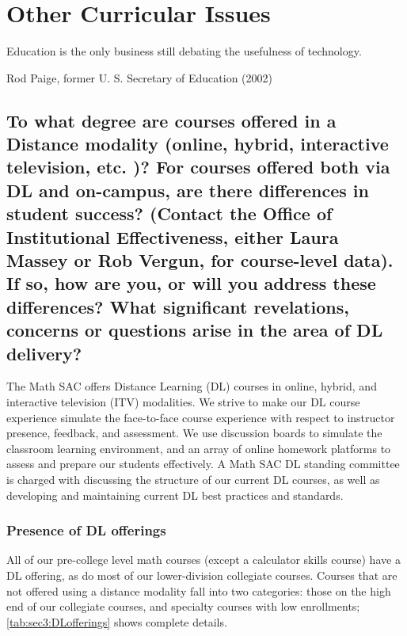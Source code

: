 \chapter{Other  Curricular Issues}\label{chap:otherissues}
\epigraph{Education is the only business still debating the usefulness of
	technology.}{Rod Paige, former U.
	S.
	Secretary of Education (2002)} \section[Distance education]{To what degree are courses offered in a Distance modality (online, hybrid, interactive television, etc.
  )?
  For courses offered both via DL and on-campus, are there differences in student success?
  (Contact
  the Office of Institutional Effectiveness, either Laura Massey or Rob Vergun,
  for course-level data).
  If so, how are you, or will you address these differences?
  What significant revelations, concerns or questions arise in the area of DL delivery?
 }\label{other:sec:distancelearning}

The Math SAC offers Distance Learning (DL) courses in online, hybrid, and interactive television (ITV) modalities.
We strive to make our DL course experience simulate the face-to-face course experience with respect to instructor presence, feedback, and assessment.
We use discussion boards to simulate the classroom learning environment, and an array of online homework platforms to assess and prepare our students effectively.
A Math SAC DL standing committee is charged with discussing the structure of our current DL courses, as well as developing and maintaining current DL best practices and standards.

\subsection{Presence of DL offerings}
All of our pre-college level math courses (except a calculator skills course) have a DL offering, as do most of our lower-division collegiate courses.
Courses that are not offered using a distance modality fall into two categories: those on the high end of our collegiate courses, and specialty courses with low enrollments; \cref{tab:sec3:DLofferings} shows complete details.

